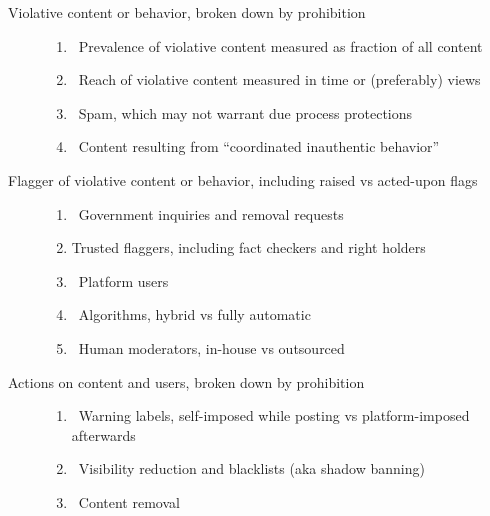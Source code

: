 
\begin{description}
\item[Violative content or behavior, broken down by prohibition]\hfill
    \begin{enumerate}
        \item {}~Prevalence of violative content measured as fraction
            of all content \label{itm:prevalence}
        \item {}~Reach of violative content measured in time
            or (preferably) views \label{itm:reach}
        \item {}~Spam, which may not warrant due process
            protections \label{itm:spam}
        \item {}~Content resulting from ``coordinated inauthentic
            behavior'' \label{itm:coordination}
    \end{enumerate}
\item[Flagger of violative content or behavior, including raised vs acted-upon flags]
    \hfill
    \begin{enumerate}[resume]
        \item {}~Government inquiries and removal requests
            \label{itm:government}
        \item {} Trusted flaggers, including fact checkers and 
            right holders \label{itm:flaggers}
        \item {}~Platform users \label{itm:users}
        \item {}~Algorithms, hybrid vs fully automatic
            \label{itm:algorithms}
        \item {}~Human moderators, in-house vs outsourced
            \label{criterion:moderators}
    \end{enumerate}
\item[Actions on content and users, broken down by prohibition]\hfill
    \begin{enumerate}[resume]
        \item {}~Warning labels, self-imposed while posting vs
            platform-imposed afterwards \label{itm:labels}
        \item {}~Visibility reduction and blacklists (aka shadow
            banning) \label{itm:visibility}
        \item {}~Content removal \label{itm:removal}

\end{enumerate}
\end{description}
